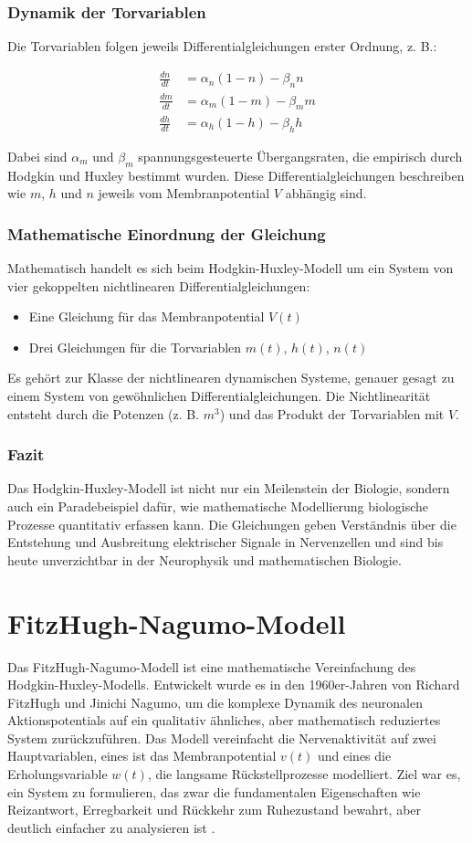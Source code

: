 \begin{refsection}
\subsubsection{Dynamik der Torvariablen}
Die Torvariablen folgen jeweils Differentialgleichungen erster Ordnung, z. B.:

\begin{align}
	\frac{dn}{dt} &= \alpha_n (1 - n) - \beta_n n \\
	\frac{dm}{dt} &= \alpha_m (1 - m) - \beta_m m \\
	\frac{dh}{dt} &= \alpha_h (1 - h) - \beta_h h 
\end{align}

Dabei sind $\alpha_m$ und $\beta_m$ spannungsgesteuerte Übergangsraten, die empirisch durch Hodgkin und Huxley bestimmt wurden.
Diese Differentialgleichungen beschreiben wie $m$, $h$ und $n$ jeweils vom Membranpotential $V$ abhängig sind.
\subsubsection{Mathematische Einordnung der Gleichung}
Mathematisch handelt es sich beim Hodgkin-Huxley-Modell um ein System von vier gekoppelten nichtlinearen
Differentialgleichungen:
\begin{itemize}
    \item Eine Gleichung für das Membranpotential $V(t)$
    \item Drei Gleichungen für die Torvariablen $m(t)$, $h(t)$, $n(t)$
\end{itemize}
Es gehört zur Klasse der nichtlinearen dynamischen Systeme, genauer gesagt zu einem System von gewöhnlichen Differentialgleichungen. Die Nichtlinearität entsteht durch die Potenzen (z. B. $m^3$) und das Produkt der Torvariablen mit $V$.
\subsubsection{Fazit}
Das Hodgkin-Huxley-Modell ist nicht nur ein Meilenstein der Biologie, sondern auch ein Paradebeispiel dafür, wie mathematische Modellierung biologische Prozesse quantitativ erfassen kann. Die Gleichungen geben Verständnis über die Entstehung und Ausbreitung elektrischer Signale in Nervenzellen und sind bis heute unverzichtbar in der Neurophysik und mathematischen Biologie.

\section{FitzHugh-Nagumo-Modell}
Das FitzHugh-Nagumo-Modell ist eine mathematische Vereinfachung des Hodgkin-Huxley-Modells. Entwickelt wurde es in den 1960er-Jahren von Richard FitzHugh und Jinichi Nagumo, um die komplexe Dynamik des neuronalen Aktionspotentials auf ein qualitativ ähnliches, aber mathematisch reduziertes System zurückzuführen.
Das Modell vereinfacht die Nervenaktivität auf zwei Hauptvariablen, eines ist das Membranpotential $v(t)$ und eines die Erholungsvariable $w(t)$, die langsame Rückstellprozesse modelliert.
Ziel war es, ein System zu formulieren, das zwar die fundamentalen Eigenschaften wie Reizantwort, Erregbarkeit und Rückkehr zum Ruhezustand bewahrt, aber deutlich einfacher zu analysieren ist 
\cite{nerven:InaLammers.31.08.2015}.

\end{refsection}

